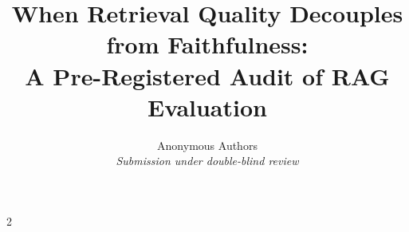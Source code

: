 \documentclass[10pt]{article}
\title{\Large\bfseries When Retrieval Quality Decouples from Faithfulness:\\[0.2em]
A Pre-Registered Audit of RAG Evaluation}
\author{Anonymous Authors\\\textit{Submission under double-blind review}}
\date{}
\theoremstyle{plain}
\theoremstyle{definition}
\begin{document}
\maketitle

\begin{abstract}

\end{abstract}















{\footnotesize
\setlength{\columnsep}{12pt}
\begin{multicols}{2}


\end{multicols}
}
\end{document}
